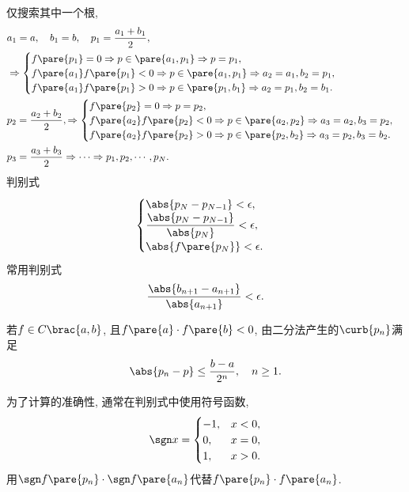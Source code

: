 \documentclass[hidelinks]{ctexart}
\begin{document}
仅搜索其中一个根,
\begin{align*}
    & a_1 = a, \quad b_1 = b,\quad p_1 = \frac{a_1 + b_1}{2}, \\
    & \Rightarrow \begin{cases}
        f\pare{p_1} = 0 \Rightarrow p\in \pare{a_1,p_1} \Rightarrow p = p_1, \\
        f\pare{a_1}f\pare{p_1} < 0 \Rightarrow p\in\pare{a_1,p_1} \Rightarrow a_2 = a_1, b_2 = p_1, \\
        f\pare{a_1}f\pare{p_1} > 0 \Rightarrow p\in\pare{p_1,b_1} \Rightarrow a_2 = p_1, b_2 = b_1.
    \end{cases} \\
    & p_2 = \frac{a_2 + b_2}{2}, \Rightarrow \begin{cases}
        f\pare{p_2} = 0 \Rightarrow p = p_2, \\
        f\pare{a_2}f\pare{p_2} < 0 \Rightarrow p \in \pare{a_2,p_2} \Rightarrow a_3 = a_2, b_3 = p_2, \\
        f\pare{a_2}f\pare{p_2} > 0 \Rightarrow p \in \pare{p_2,b_2} \Rightarrow a_3 = p_2, b_3 = b_2.
    \end{cases} \\
    & p_3 = \frac{a_3 + b_3}{2} \Rightarrow \cdots \Rightarrow p_1,p_2,\cdots,p_N.
\end{align*}
判别式
\[ \begin{cases}
    \abs{p_N - p_{N-1}} < \epsilon, \\
    \displaystyle \frac{\abs{p_N - p_{N-1}}}{\abs{p_N}} < \epsilon, \\
    \abs{f\pare{p_N}} < \epsilon.
\end{cases} \]
常用判别式
\[ \frac{\abs{b_{n+1} - a_{n+1}}}{\abs{a_{n+1}}} < \epsilon. \]
\begin{theorem}
    若$f\in C\brac{a,b}$, 且$f\pare{a} \cdot f\pare{b} < 0$, 由二分法产生的$\curb{p_n}$满足
    \[ \abs{p_n - p} \le \frac{b-a}{2^n},\quad n\ge 1. \]
\end{theorem}
为了计算的准确性, 通常在判别式中使用符号函数,
\[ 
    \sgn x = \begin{cases}
        -1, & x<0, \\
        0, & x=0, \\
        1, & x>0.
    \end{cases}
 \]
 用$\sgn f\pare{p_n} \cdot \sgn f\pare{a_n}$代替$f\pare{p_n}\cdot f\pare{a_n}$.


\end{document}
